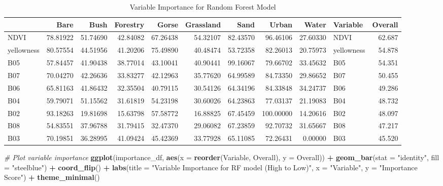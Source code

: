\documentclass[
]{article}
\newenvironment{Shaded}{\begin{snugshade}}{\end{snugshade}}
\newcommand{\AttributeTok}[1]{\textcolor[rgb]{0.13,0.29,0.53}{#1}}
\newcommand{\CommentTok}[1]{\textcolor[rgb]{0.56,0.35,0.01}{\textit{#1}}}
\newcommand{\FunctionTok}[1]{\textcolor[rgb]{0.13,0.29,0.53}{\textbf{#1}}}
\newcommand{\NormalTok}[1]{#1}
\newcommand{\SpecialCharTok}[1]{\textcolor[rgb]{0.81,0.36,0.00}{\textbf{#1}}}
\newcommand{\StringTok}[1]{\textcolor[rgb]{0.31,0.60,0.02}{#1}}
\begin{document}
\begin{longtable}[l]{lrrrrrrrrlr}
\caption{\label{tab:rf_summary}Variable Importance for Random Forest Model}\\
\toprule
 & Bare & Bush & Forestry & Gorse & Grassland & Sand & Urban & Water & Variable & Overall\\
\midrule
NDVI & 78.81922 & 51.74690 & 42.84082 & 67.26438 & 54.32107 & 82.43570 & 96.46106 & 27.60330 & NDVI & 62.687\\
yellowness & 80.57554 & 44.51956 & 41.20206 & 75.49890 & 40.48474 & 53.72358 & 82.26013 & 20.75973 & yellowness & 54.878\\
B05 & 57.84457 & 41.90438 & 38.77014 & 43.10041 & 40.90441 & 99.16067 & 79.66702 & 33.45632 & B05 & 54.351\\
B07 & 70.04270 & 42.26636 & 33.83277 & 42.12963 & 35.77620 & 64.99589 & 84.73350 & 29.86652 & B07 & 50.455\\
B06 & 65.81163 & 41.86432 & 32.35504 & 40.79115 & 30.54126 & 64.34196 & 84.33848 & 34.24737 & B06 & 49.286\\
\addlinespace
B04 & 59.79071 & 51.15562 & 31.61819 & 54.23198 & 30.60026 & 64.23863 & 77.03137 & 21.19083 & B04 & 48.732\\
B02 & 93.18263 & 19.81698 & 15.63798 & 57.58772 & 16.88825 & 67.45459 & 100.00000 & 14.20616 & B02 & 48.097\\
B08 & 54.83551 & 37.96788 & 31.79415 & 32.47370 & 29.06082 & 67.23859 & 92.70732 & 31.65667 & B08 & 47.217\\
B03 & 70.19851 & 36.28995 & 41.09424 & 45.42369 & 33.77928 & 65.11085 & 72.26431 & 0.00000 & B03 & 45.520\\
\bottomrule
\end{longtable}

\begin{Shaded}
\begin{Highlighting}[]
\CommentTok{\# Plot variable importance}
\FunctionTok{ggplot}\NormalTok{(importance\_df, }\FunctionTok{aes}\NormalTok{(}\AttributeTok{x =} \FunctionTok{reorder}\NormalTok{(Variable, Overall), }\AttributeTok{y =}\NormalTok{ Overall)) }\SpecialCharTok{+}
  \FunctionTok{geom\_bar}\NormalTok{(}\AttributeTok{stat =} \StringTok{"identity"}\NormalTok{, }\AttributeTok{fill =} \StringTok{"steelblue"}\NormalTok{) }\SpecialCharTok{+}
  \FunctionTok{coord\_flip}\NormalTok{() }\SpecialCharTok{+}
  \FunctionTok{labs}\NormalTok{(}\AttributeTok{title =} \StringTok{"Variable Importance for RF model (High to Low)"}\NormalTok{,}
       \AttributeTok{x =} \StringTok{"Variable"}\NormalTok{, }\AttributeTok{y =} \StringTok{"Importance Score"}\NormalTok{) }\SpecialCharTok{+}
  \FunctionTok{theme\_minimal}\NormalTok{()}
\end{Highlighting}
\end{Shaded}
\end{document}
